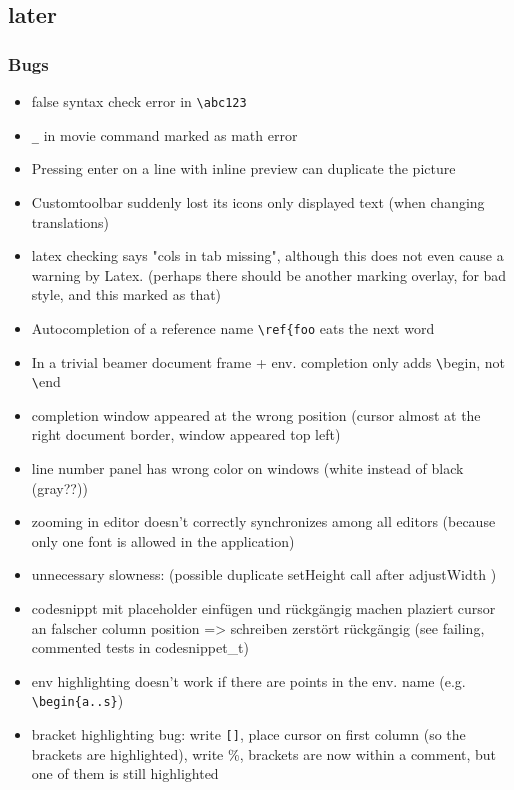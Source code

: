 \documentclass[10pt,a4paper,landscape]{report}
\begin{document}
\subsection{later}

\subsubsection{Bugs}
\begin{itemize}
\item false syntax check error in \verb+\abc123+
\item \verb+_+ in movie command marked as math error
\item Pressing enter on a line with inline preview can duplicate the picture
\item Customtoolbar suddenly lost its icons only displayed text (when changing translations)
\item latex checking says "cols in tab missing", although this does not even cause a warning by Latex. (perhaps there should be another marking overlay, for bad style, and this marked as that)
\item Autocompletion of a reference name \verb+\ref{foo+ eats the next word
\item In a trivial beamer document frame + env. completion only adds \verb+\+begin, not \verb+\+end
\item completion window appeared at the wrong position (cursor almost at the right document border, window appeared top left)
\item line number panel has wrong color on windows (white instead of black (gray??)) 
\item zooming in editor doesn't correctly synchronizes among all editors (because only one font is allowed in the application)
\item unnecessary slowness: (possible duplicate setHeight call after adjustWidth )
\item codesnippt mit placeholder einfügen und rückgängig machen plaziert cursor an falscher column position => schreiben zerstört rückgängig (see failing, commented tests in codesnippet\_t)
\item  env highlighting doesn't work if there are points in the env. name (e.g. \verb+\begin{a..s}+)
\item bracket highlighting bug: write \verb+[]+, place cursor on first column (so the brackets are highlighted), write \%, brackets are now within a comment, but one of them is still highlighted

\end{itemize}
\end{document}
